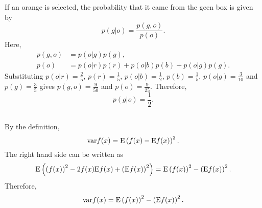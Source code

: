 If an orange is selected, the probability that it came from the geen box is given by
%
\begin{equation}
p(g | o) = \frac{p(g, o)}{p(o)}.
\end{equation}
%
Here,
%
\begin{equation}
\begin{aligned}
p(g, o) &= p(o | g) p(g), \\
p(o) & = p(o | r) p(r) + p(o | b) p(b) + p(o | g) p(g).
\end{aligned}
\end{equation}
%
Substituting $p(o | r) = \frac{2}{5}$, $p(r) = \frac{1}{5}$, $p(o | b) = \frac{1}{2}$, $p(b) = \frac{1}{5}$, $p(o | g) = \frac{3}{10}$ and $p(g) = \frac{3}{5}$ gives $p(g, o) = \frac{9}{50}$ and $p(o) = \frac{9}{25}$.
%
Therefore,
\begin{equation}
p(g | o) = \frac{1}{2}.
\end{equation}




\subsection{}
By the definition, 
%
\begin{equation}
{\rm var} f(x) = {\rm E} \left( f(x) - {\rm E} f(x) \right) ^ 2.
\end{equation}
%
The right hand side can be written as 
%
\begin{equation}
{\rm E} \left( \left( f(x) \right) ^ 2 - 2 f(x) {\rm E} f(x) + \left( {\rm E} f(x) \right) ^ 2 \right) = {\rm E} \left( f(x) \right) ^ 2 - \left( {\rm E} f(x) \right) ^ 2.
\end{equation}
%
Therefore, 
%
\begin{equation}
{\rm var} f(x) = {\rm E} \left( f(x) \right) ^ 2 - \left( {\rm E} f(x) \right) ^ 2.
\end{equation}
%


